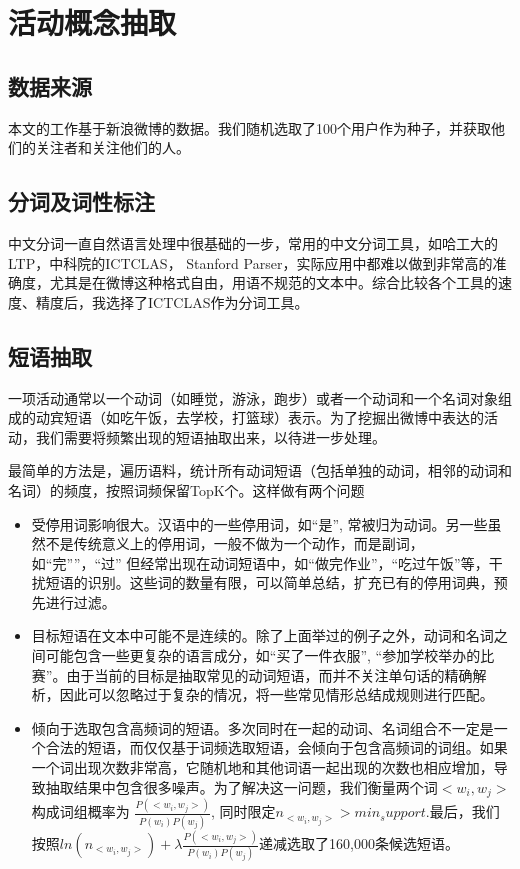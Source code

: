 
\chapter{活动概念抽取}
\section{数据来源}
本文的工作基于新浪微博的数据。我们随机选取了100个用户作为种子，并获取他们的关注者和关注他们的人。

\section{分词及词性标注}
中文分词一直自然语言处理中很基础的一步，常用的中文分词工具，如哈工大的LTP，中科院的ICTCLAS， Stanford Parser，实际应用中都难以做到非常高的准确度，尤其是在微博这种格式自由，用语不规范的文本中。综合比较各个工具的速度、精度后，我选择了ICTCLAS作为分词工具。

\section{短语抽取}
一项活动通常以一个动词（如睡觉，游泳，跑步）或者一个动词和一个名词对象组成的动宾短语（如吃午饭，去学校，打篮球）表示。为了挖掘出微博中表达的活动，我们需要将频繁出现的短语抽取出来，以待进一步处理。

最简单的方法是，遍历语料，统计所有动词短语（包括单独的动词，相邻的动词和名词）的频度，按照词频保留TopK个。这样做有两个问题
\begin{itemize}
\item 受停用词影响很大。汉语中的一些停用词，如``是'', 常被归为动词。另一些虽然不是传统意义上的停用词，一般不做为一个动作，而是副词，如``完''”，``过'' 但经常出现在动词短语中，如``做完作业''，``吃过午饭''等，干扰短语的识别。这些词的数量有限，可以简单总结，扩充已有的停用词典，预先进行过滤。
\item 目标短语在文本中可能不是连续的。除了上面举过的例子之外，动词和名词之间可能包含一些更复杂的语言成分，如``买了一件衣服'', ``参加学校举办的比赛''。由于当前的目标是抽取常见的动词短语，而并不关注单句话的精确解析，因此可以忽略过于复杂的情况，将一些常见情形总结成规则进行匹配。
\item 倾向于选取包含高频词的短语。多次同时在一起的动词、名词组合不一定是一个合法的短语，而仅仅基于词频选取短语，会倾向于包含高频词的词组。如果一个词出现次数非常高，它随机地和其他词语一起出现的次数也相应增加，导致抽取结果中包含很多噪声。为了解决这一问题，我们衡量两个词$<w_i, w_j>$构成词组概率为
$\frac{P(<w_i, w_j>)}{P(w_i)P(w_j)}$, 同时限定$n_{<w_i,w_j>} > min_support$.最后，我们按照$ln(n_{<w_i, w_j>}) + \lambda\frac{P(<w_i, w_j>)}{P(w_i)P(w_j)}$递减选取了160,000条候选短语。
\end{itemize}

